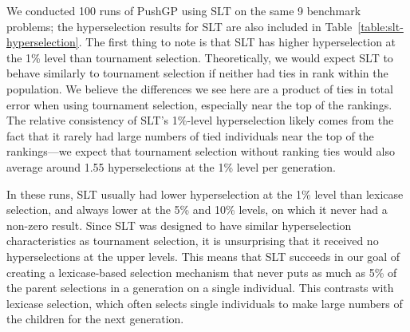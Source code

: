 \documentclass{sig-alternate}
\begin{document}
We conducted 100 runs of PushGP using SLT on the same 9 benchmark problems; the hyperselection results for SLT are also included in Table~\ref{table:slt-hyperselection}. The first thing to note is that SLT has higher hyperselection at the 1\% level than tournament selection. Theoretically, we would expect SLT to behave similarly to tournament selection if neither had ties in rank within the population. We believe the differences we see here are a product of ties in total error when using tournament selection, especially near the top of the rankings. The relative consistency of SLT's 1\%-level hyperselection likely comes from the fact that it rarely had large numbers of tied individuals near the top of the rankings---we expect that tournament selection without ranking ties would also average around 1.55 hyperselections at the 1\% level per generation.


In these runs, SLT usually had lower hyperselection at the 1\% level than lexicase selection, and always lower at the 5\% and 10\% levels, on which it never had a non-zero result. Since SLT was designed to have similar hyperselection characteristics as tournament selection, it is unsurprising that it received no hyperselections at the upper levels. This means that SLT succeeds in our goal of creating a lexicase-based selection mechanism that never puts as much as 5\% of the parent selections in a generation on a single individual. This contrasts with lexicase selection, which often selects single individuals to make large numbers of the children for the next generation.
\end{document}
